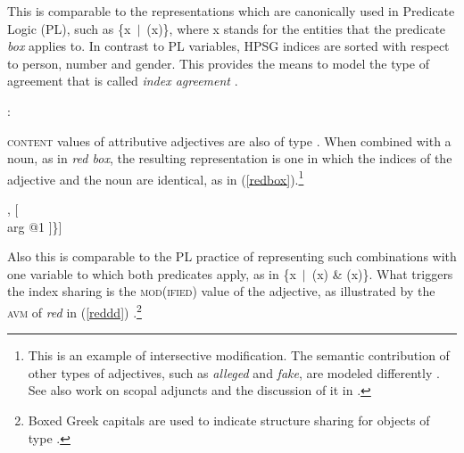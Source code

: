 \documentclass[output=paper
                ,modfonts
                ,nonflat
	        ,collection
	        ,collectionchapter
	        ,collectiontoclongg
 	        ,biblatex
                ,babelshorthands
                ,newtxmath
                ,draftmode
                ,colorlinks, citecolor=brown
]{./langsci/langscibook}
\begin{document}
\noindent
This is comparable to the representations which are canonically used in 
Predicate Logic (PL), such as \{x~$|$~(x)\}, where x stands for 
the entities that the predicate \emph{box} applies to. In contrast to 
PL variables, HPSG indices are sorted with respect to person, number 
and gender. This provides the means to model the type of agreement that 
is called \emph{index agreement} .

\begin{exe} 
\ex  {}: \begin{avm}
                     \end{avm} 
\end{exe} 

\textsc{content} values of attributive adjectives are also of type . 
When combined with a noun, as in \emph{red box}, the resulting representation 
is one in which the indices of the adjective and the noun are identical, as in 
(\ref{redbox}).\footnote{This is an example of intersective modification. 
The semantic contribution of other types of adjectives, such as  
\emph{alleged} and \emph{fake}, are modeled differently \citep[330--331]{ps2}. See also
 work on scopal adjuncts and the discussion of it in .}   

\begin{exe} 
\ex\label{redbox} 
\begin{avm}
[\type{scope-object}     \\
 index @1                \\
 restr \{ [\type{red}    \\
             arg @1 ],
            [  \\
             arg @1 ]\}]
\end{avm}
\end{exe}

\noindent
Also this is comparable to the PL practice of representing such 
combinations with one variable to which both predicates apply, as in 
\{x~$|$~(x) \& (x)\}. What triggers the index sharing is 
the \textsc{mod(ified)} value of the adjective, as illustrated by the \textsc{avm} of 
\emph{red} in (\ref{reddd}) \citep[55]{ps2}.\footnote{Boxed Greek capitals
are used to indicate structure sharing for objects of 
type  \citep[]{GS00}.} 
\end{document}

